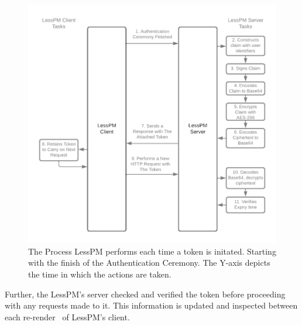\begin{figure}[htbp]
  \begin{center}

  \includegraphics[scale=0.50]{images/JWT-JWE-process}
  \caption{The Process LessPM performs each time a token is initated.
  Starting with the finish of the Authentication Ceremony. The Y-axis depicts
  the time in which the actions are taken.}
  \label{fig:JWT-process}
  \end{center}
\end{figure}

Further, the LessPM's server checked and verified the token before proceeding
with any requests made to it.
This information is updated and inspected between each
re-render~\cite{react-component} of LessPM's client.